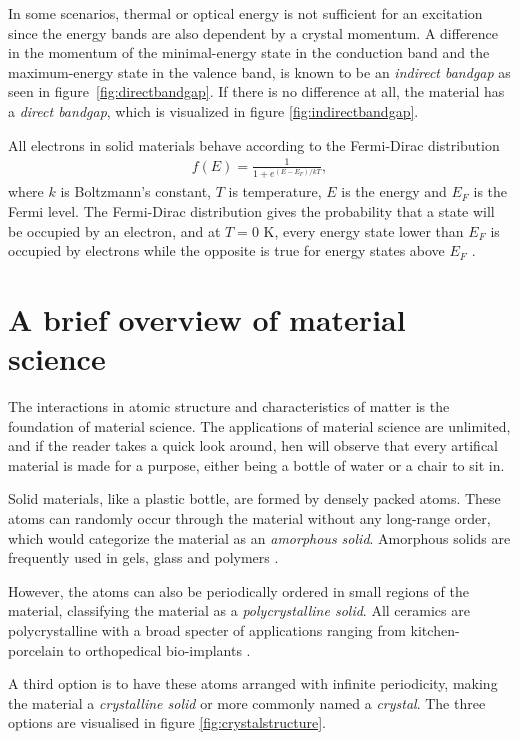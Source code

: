 In some scenarios, thermal or optical energy is not sufficient for an excitation since the energy bands are also dependent by a crystal momentum. A difference in the momentum of the minimal-energy state in the conduction band and the maximum-energy state in the valence band, is known to be an \textit{indirect bandgap} as seen in figure \ref{fig:directbandgap}. If there is no difference at all, the material has a \textit{direct bandgap}, which is visualized in figure \ref{fig:indirectbandgap}.

All electrons in solid materials behave according to the Fermi-Dirac distribution
\begin{align*}
  f(E) = \frac{1}{1+e^{(E-E_F)/kT}},
\end{align*}
where $k$ is Boltzmann's constant, $T$ is temperature, $E$ is the energy and $E_F$ is the Fermi level. The Fermi-Dirac distribution gives the probability that a state will be occupied by an electron, and at $T=0$ K, every energy state lower than $E_F$ is occupied by electrons while the opposite is true for energy states above $E_F$ \cite{BenStreetman2015}.

\section{A brief overview of material science}

The interactions in atomic structure and characteristics of matter is the foundation of material science. The applications of material science are unlimited, and if the reader takes a quick look around, hen will observe that every artifical material is made for a purpose, either being a bottle of water or a chair to sit in.

Solid materials, like a plastic bottle, are formed by densely packed atoms. These atoms can randomly occur through the material without any long-range order, which would categorize the material as an \textit{amorphous solid}. Amorphous solids are frequently used in gels, glass and polymers \cite{BenStreetman2015}.

However, the atoms can also be periodically ordered in small regions of the material, classifying the material as a \textit{polycrystalline solid}. All ceramics are polycrystalline with a broad specter of applications ranging from kitchen-porcelain to orthopedical bio-implants \cite{Renganathan2018}.

A third option is to have these atoms arranged with infinite periodicity, making the material a \textit{crystalline solid} or more commonly named a \textit{crystal}. The three options are visualised in figure \ref{fig:crystalstructure}.

